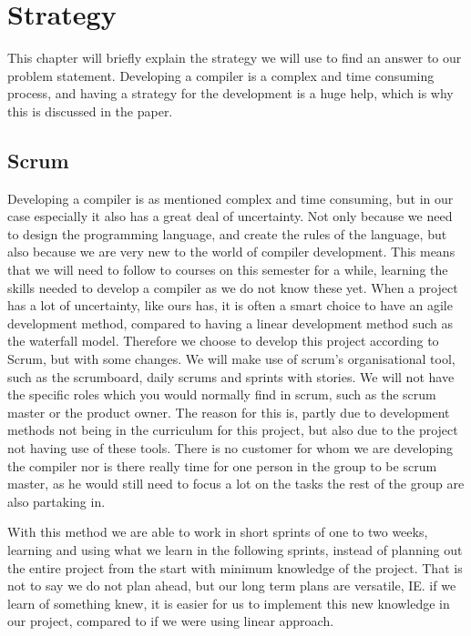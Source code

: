 \chapter{Strategy}\label{Metode}

This chapter will briefly explain the strategy we will use to find an answer to our problem statement. 
Developing a compiler is a complex and time consuming process, and having a strategy for the development is a huge help, which is why this is discussed in the paper.

\section{Scrum}

Developing a compiler is as mentioned complex and time consuming, but in our case especially it also has a great deal of uncertainty. 
Not only because we need to design the programming language, and create the rules of the language, but also because we are very new to the world of compiler development.
This means that we will need to follow to courses on this semester for a while, learning the skills needed to develop a compiler as we do not know these yet.
When a project has a lot of uncertainty, like ours has, it is often a smart choice to have an agile development method, compared to having a linear development method such as the waterfall model.
Therefore we choose to develop this project according to Scrum, but with some changes.
We will make use of scrum's organisational tool, such as the scrumboard, daily scrums and sprints with stories.
We will not have the specific roles which you would normally find in scrum, such as the scrum master or the product owner. \citep{Scrum}
The reason for this is, partly due to development methods not being in the curriculum for this project, but also due to the project not having use of these tools.
There is no customer for whom we are developing the compiler nor is there really time for one person in the group to be scrum master, as he would still need to focus a lot on the tasks the rest of the group are also partaking in.

With this method we are able to work in short sprints of one to two weeks, learning and using what we learn in the following sprints, instead of planning out the entire project from the start with minimum knowledge of the project.
That is not to say we do not plan ahead, but our long term plans are versatile, IE. if we learn of something knew, it is easier for us to implement this new knowledge in our project, compared to if we were using linear approach.